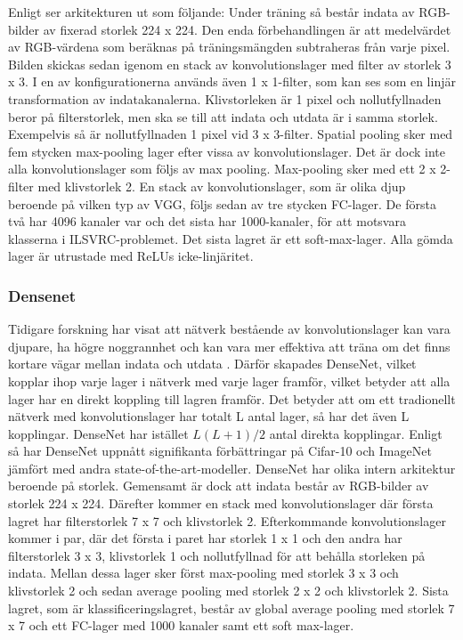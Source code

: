 \documentclass[]{kththesis}
\begin{document}
Enligt \cite{simonyan2014very} ser arkitekturen ut som följande: Under träning så består indata av RGB-bilder av fixerad storlek 224 x 224. Den enda förbehandlingen är att medelvärdet av RGB-värdena som beräknas på träningsmängden subtraheras från varje pixel. Bilden skickas sedan igenom en stack av konvolutionslager med filter av storlek 3 x 3. I en av konfigurationerna används även 1 x 1-filter, som kan ses som en linjär transformation av indatakanalerna. Klivstorleken är 1 pixel och nollutfyllnaden beror på filterstorlek, men ska se till att indata och utdata är i samma storlek. Exempelvis så är nollutfyllnaden 1 pixel vid 3 x 3-filter. Spatial pooling sker med fem stycken max-pooling lager efter vissa av konvolutionslager. Det är dock inte alla konvolutionslager som följs av max pooling. Max-pooling sker med ett 2 x 2-filter med klivstorlek 2. En stack av konvolutionslager, som är olika djup beroende på vilken typ av VGG, följs sedan av tre stycken FC-lager. De första två har 4096 kanaler var och det sista har 1000-kanaler, för att motsvara klasserna i ILSVRC-problemet. Det sista lagret är ett soft-max-lager. Alla gömda lager är utrustade med ReLUs icke-linjäritet. 

\subsubsection{Densenet}
Tidigare forskning har visat att nätverk bestående av konvolutionslager kan vara djupare, ha högre noggrannhet och kan vara mer effektiva att träna om det finns kortare vägar mellan indata och utdata \parencite{huang2017densely}. Därför skapades DenseNet, vilket kopplar ihop varje lager i nätverk med varje lager framför, vilket betyder att alla lager har en direkt koppling till lagren framför. Det betyder att om ett tradionellt nätverk med konvolutionslager har totalt L antal lager, så har det även L kopplingar. DenseNet har istället \begin{math} L(L+1)/2 \end{math} antal direkta kopplingar. Enligt \cite{huang2017densely} så har DenseNet uppnått signifikanta förbättringar på Cifar-10 och ImageNet jämfört med andra state-of-the-art-modeller. DenseNet har olika intern arkitektur beroende på storlek. Gemensamt är dock att indata består av RGB-bilder av storlek 224 x 224. Därefter kommer en stack med konvolutionslager där första lagret har filterstorlek 7 x 7 och klivstorlek 2. Efterkommande konvolutionslager kommer i par, där det första i paret har storlek 1 x 1 och den andra har filterstorlek 3 x 3, klivstorlek 1 och nollutfyllnad för att behålla storleken på indata. Mellan dessa lager sker först max-pooling med storlek 3 x 3 och klivstorlek 2 och sedan average pooling med storlek 2 x 2 och klivstorlek 2. Sista lagret, som är klassificeringslagret, består av global average pooling med storlek 7 x 7 och ett FC-lager med 1000 kanaler samt ett soft max-lager.
\end{document}
